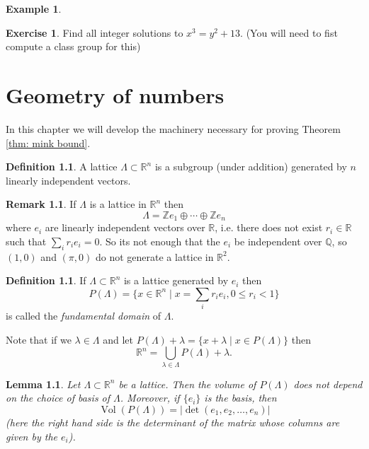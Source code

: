 \documentclass[11pt,a4paper]{report}
\theoremstyle{plain}
\newtheorem{lemma}[subsection]{Lemma}
\theoremstyle{definition}
\newtheorem{definition}[subsection]{Definition}
\newtheorem{exmp}[subsection]{Example}
\theoremstyle{definition}
\newtheorem{rmrk}[subsection]{Remark}
\newtheorem{question}[subsection]{Exercise}
\newcommand{\ZZ}{\mathbb{Z}}
\newcommand{\RR}{\mathbb{R}}
\def\QQ{\mathbb{Q}}
\def \lam {\lambda}
\DeclareMathOperator{\Vol}{Vol}
\begin{document}
\begin{exmp}
		
		
		
		
	\end{exmp}
	
	
	
	\begin{question}
		Find all integer solutions to $x^3=y^2+13$. (You will need to fist compute a class group for this)
	\end{question}
	
	
	
	
	
	\chapter{Geometry of numbers}
	
	
	In this chapter we will develop the machinery necessary for proving Theorem \ref{thm: mink bound}.
	
	\begin{definition}
		A lattice $\Lambda \subset \RR^n$ is a subgroup (under addition) generated by $n$ linearly independent vectors.
	\end{definition}
	
	\begin{rmrk}
		If $\Lambda$ is a lattice in $\RR^n$ then \[\Lambda= \ZZ e_1 \oplus \cdots \oplus \ZZ e_n\] where $e_i$ are linearly independent vectors over $\RR$, i.e. there does not exist $r_i \in \RR$ such that $\sum_i r_ie_i =0$.
		So its not enough that the $e_i$ be independent over $\QQ$, so $(1,0)$ and $(\pi,0)$ do not generate a lattice in $\RR^2$.
	\end{rmrk}
	
	\begin{definition}
		If $\Lambda \subset \RR^n$ is a lattice generated by $e_i$ then \[P(\Lambda)=\{x \in \RR^n \mid x=\sum_i r_ie_i, 0 \leq r_i < 1 \}\] is called the \textit{fundamental domain} of $\Lambda$.
	\end{definition}
	
	Note that if we $\lam \in \Lambda$  and let $P(\Lambda)+\lambda=\{x+ \lam \mid x \in P(\Lambda)\}$ then \[\RR^n= \bigcup_{\lam \in \Lambda} P(\Lambda) +\lam. \]
	
	\begin{lemma}
		Let $\Lambda \subset \RR^n$ be a lattice. Then the volume of $P(\Lambda)$ does not depend on the choice of basis of $\Lambda$. Moreover, if $\{e_i\}$ is the basis, then \[\Vol(P(\Lambda))=|\det(e_1,e_2,\dots,e_n)| \] (here the right hand side is the determinant of the matrix whose columns are given by the $e_i$).
	\end{lemma}
	
\end{document}
